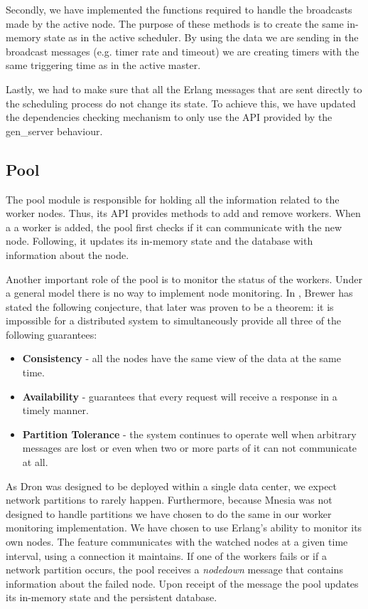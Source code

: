 \documentclass[11pt,a4paper,twoside]{report}
\begin{document}
Secondly, we have implemented the functions required to handle the broadcasts made by the active node. The purpose of these methods is to create the same in-memory state as in the active scheduler. By using the data we are sending in the broadcast messages (e.g. timer rate and timeout) we are creating timers with the same triggering time as in the active master.


Lastly, we had to make sure that all the Erlang messages that are sent directly to the scheduling process do not change its state. To achieve this, we have updated the dependencies checking mechanism to only use the API provided by the gen\_server behaviour.

\subsection{Pool}
The pool module is responsible for holding all the information related to the worker nodes. Thus, its API provides methods to add and remove workers. When a a worker is added, the pool first checks if it can communicate with the new node. Following, it updates its in-memory state and the database with information about the node.


Another important role of the pool is to monitor the status of the workers. Under a general model there is no way to implement node monitoring. In \cite{CAP}, Brewer has stated the following conjecture, that later was proven to be a theorem: it is impossible for a distributed system to simultaneously provide all three of the following guarantees:

\begin{itemize}
\item{}
\textbf{Consistency} - all the nodes have the same view of the data at the same time.
\item{}
\textbf{Availability} - guarantees that every request will receive a response in a timely manner.
\item{}
\textbf{Partition Tolerance} - the system continues to operate well when arbitrary messages are lost or even when two or more parts of it can not communicate at all.
\end{itemize}


As Dron was designed to be deployed within a single data center, we expect network partitions to rarely happen. Furthermore, because Mnesia was not designed to handle partitions we have chosen to do the same in our worker monitoring implementation. We have chosen to use Erlang's ability to monitor its own nodes. The feature communicates with the watched nodes at a given time interval, using a connection it maintains. If one of the workers fails or if a network partition occurs, the pool receives a \textit{nodedown} message that contains information about the failed node. Upon receipt of the message the pool updates its in-memory state and the persistent database.
\end{document}
